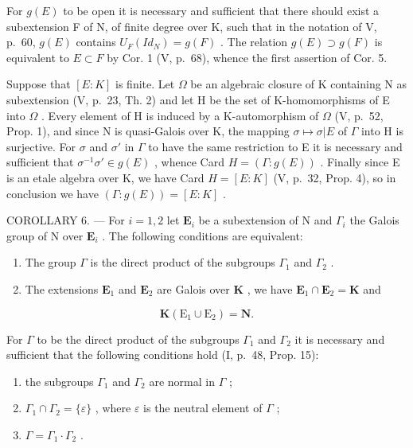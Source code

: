 For \(g(E)\) to be open it is necessary and sufficient that there should exist a subextension F of N, of finite degree over K, such that in the notation of V, p.~60, \(g(E)\) contains \(U_{F}(Id_{N}) = g(F)\) . The relation \(g(E) \supset g(F)\) is equivalent to \(E \subset F\) by Cor. 1 (V, p.~68), whence the first assertion of Cor. 5.

Suppose that \([E:K]\) is finite. Let \(\Omega\) be an algebraic closure of K containing N as subextension (V, p.~23, Th. 2) and let H be the set of K-homomorphisms of E into \(\Omega\) . Every element of H is induced by a K-automorphism of \(\Omega\) (V, p.~52, Prop. 1), and since N is quasi-Galois over K, the mapping \(\sigma\mapsto\sigma|E\) of \(\Gamma\) into H is surjective. For \(\sigma\) and \(\sigma'\) in \(\Gamma\) to have the same restriction to E it is necessary and sufficient that \(\sigma^{-1}\sigma'\in g(E)\) , whence Card \(H=(\Gamma:g(E))\) . Finally since E is an etale algebra over K, we have Card \(H=[E:K]\) (V, p.~32, Prop. 4), so in conclusion we have \((\Gamma:g(E))=[E:K]\) .

COROLLARY 6. --- For \(i=1,2\) let \(\mathbf{E}_{i}\) be a subextension of N and \(\Gamma_{i}\) the Galois group of N over \(\mathbf{E}_{i}\) . The following conditions are equivalent:

\begin{enumerate}
\def\labelenumi{\alph{enumi})}
\item
  The group \(\Gamma\) is the direct product of the subgroups \(\Gamma_1\) and \(\Gamma_2\) .
\item
  The extensions \(\mathbf{E}_1\) and \(\mathbf{E}_2\) are Galois over \(\mathbf{K}\) , we have \(\mathbf{E}_1 \cap \mathbf{E}_2 = \mathbf{K}\) and
\end{enumerate}

\[
\mathbf {K} \left(\mathrm{E} _ {1} \cup \mathrm{E} _ {2}\right) = \mathbf {N}.
\]

For \(\Gamma\) to be the direct product of the subgroups \(\Gamma_{1}\) and \(\Gamma_{2}\) it is necessary and sufficient that the following conditions hold (I, p.~48, Prop. 15):

\begin{enumerate}
\def\labelenumi{(\roman{enumi})}
\item
  the subgroups \(\Gamma_{1}\) and \(\Gamma_{2}\) are normal in \(\Gamma\) ;
\item
  \(\Gamma_1 \cap \Gamma_2 = \{\varepsilon\}\) , where \(\varepsilon\) is the neutral element of \(\Gamma\) ;
\item
  \(\Gamma = \Gamma_{1} \cdot \Gamma_{2}\) .
\end{enumerate}

